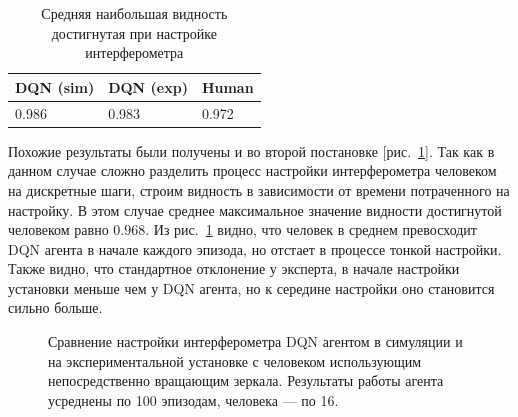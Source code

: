 \begin{table} [htbp]
    \centering
    \begin{threeparttable}
        \caption{Средняя наибольшая видность достигнутая при настройке интерферометра}\label{tab:highest_visib_dqn}
        \begin{tabular}{| p{5cm} || p{5cm} || p{5cm} |}
            \hline
            \hline
            DQN (sim) & DQN (exp) & Human \\
            \hline
            0.986 & 0.983 & 0.972 \\
            \hline
            \hline
        \end{tabular}
    \end{threeparttable}
\end{table}

Похожие результаты были получены и во второй постановке [рис.~\ref{fig:eval_visib_time}]. Так как в данном случае сложно разделить процесс настройки интерферометра человеком на дискретные шаги, строим видность в зависимости от времени потраченного на настройку. В этом случае среднее максимальное значение видности достигнутой человеком равно $0.968$. Из рис.~\ref{fig:eval_visib_time} видно, что человек в среднем превосходит DQN агента в начале каждого эпизода, но отстает в процессе тонкой настройки. Также видно, что стандартное отклонение у эксперта, в начале настройки установки меньше чем у DQN агента, но к середине настройки оно становится сильно больше. 

\begin{figure}[ht]
\caption{Сравнение настройки интерферометра DQN агентом в симуляции и на экспериментальной установке с человеком использующим непосредственно вращающим зеркала. Результаты работы агента усреднены по 100 эпизодам, человека --- по 16.}
\label{fig:eval_visib_time}
\end{figure}

